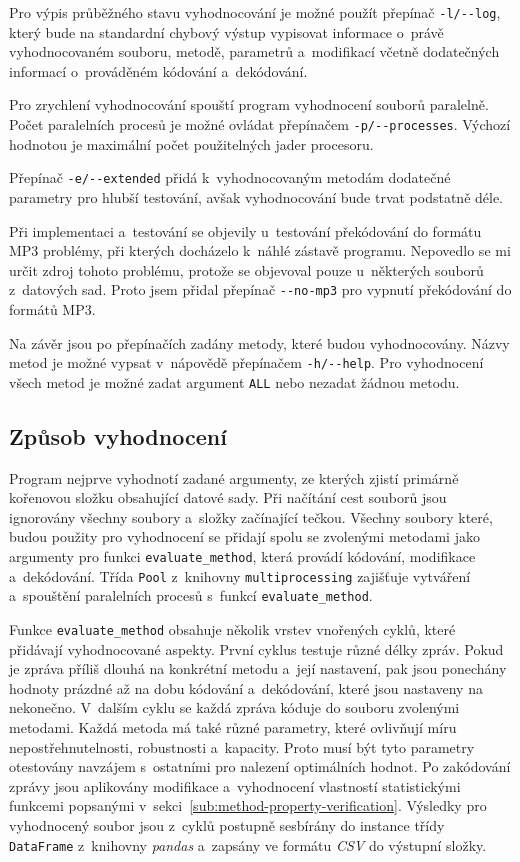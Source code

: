 Pro výpis průběžného stavu vyhodnocování je možné použít přepínač
\verb|-l/--log|, který bude na standardní chybový výstup vypisovat informace
o~právě vyhodnocovaném souboru, metodě, parametrů a~modifikací včetně
dodatečných informací o~prováděném kódování a~dekódování.

Pro zrychlení vyhodnocování spouští program vyhodnocení souborů paralelně.
Počet paralelních procesů je možné ovládat přepínačem \verb|-p/--processes|.
Výchozí hodnotou je maximální počet použitelných jader procesoru.

Přepínač \verb|-e/--extended| přidá k~vyhodnocovaným metodám dodatečné
parametry pro hlubší testování, avšak vyhodnocování bude trvat podstatně déle.

Při implementaci a~testování se objevily u~testování překódování do formátu MP3
problémy, při kterých docházelo k~náhlé zástavě programu. Nepovedlo se mi určit
zdroj tohoto problému, protože se objevoval pouze u~některých souborů
z~datových sad. Proto jsem přidal přepínač \verb|--no-mp3| pro vypnutí
překódování do formátů MP3.

Na závěr jsou po přepínačích zadány metody, které budou vyhodnocovány. Názvy
metod je možné vypsat v~nápovědě přepínačem \verb|-h/--help|. Pro vyhodnocení
všech metod je možné zadat argument \texttt{ALL} nebo nezadat žádnou metodu.

\subsection*{Způsob vyhodnocení}
\label{sub:evaluation-program}

Program nejprve vyhodnotí zadané argumenty, ze kterých zjistí primárně
kořenovou složku obsahující datové sady. Při načítání cest souborů jsou
ignorovány všechny soubory a~složky začínající tečkou. Všechny soubory které,
budou použity pro vyhodnocení se přidají spolu se zvolenými metodami jako
argumenty pro funkci \texttt{evaluate\_method}, která provádí kódování,
modifikace a~dekódování. Třída \texttt{Pool} z~knihovny
\texttt{multiprocessing} zajišťuje vytváření a~spouštění paralelních procesů
s~funkcí \texttt{evaluate\_method}.

Funkce \texttt{evaluate\_method} obsahuje několik vrstev vnořených cyklů, které
přidávají vyhodnocované aspekty. První cyklus testuje různé délky zpráv. Pokud
je zpráva příliš dlouhá na konkrétní metodu a~její nastavení, pak jsou
ponechány hodnoty prázdné až na dobu kódování a~dekódování, které jsou
nastaveny na nekonečno. V~dalším cyklu se každá zpráva kóduje do souboru
zvolenými metodami. Každá metoda má také různé parametry, které ovlivňují míru
nepostřehnutelnosti, robustnosti a~kapacity. Proto musí být tyto parametry
otestovány navzájem s~ostatními pro nalezení optimálních hodnot. Po zakódování
zprávy jsou aplikovány modifikace a~vyhodnocení vlastností statistickými
funkcemi popsanými v~sekci~\ref{sub:method-property-verification}. Výsledky pro
vyhodnocený soubor jsou z~cyklů postupně sesbírány do instance třídy
\texttt{DataFrame} z~knihovny \textit{pandas} a~zapsány ve formátu \textit{CSV}
do výstupní složky.

